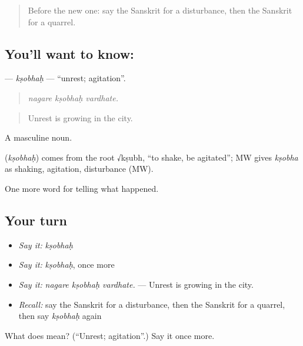 \begin{quote}
Before the new one: say the Sanskrit for a disturbance, then the Sanskrit for a quarrel.
\end{quote}

\subsection*{You'll want to know: }
\textbf{} — \emph{kṣobhaḥ} — \textquotedblleft{}unrest; agitation\textquotedblright{}.

\begin{quote}
  
\end{quote}

\begin{quote}
\emph{nagare kṣobhaḥ vardhate.}
\end{quote}

\begin{quote}
Unrest is growing in the city.
\end{quote}

A masculine noun.

\begin{cousinweb}
\textbf{} (\emph{kṣobhaḥ}) comes from the root √kṣubh, \textquotedblleft{}to shake, be agitated\textquotedblright{}; MW gives \emph{kṣobha} as shaking, agitation, disturbance (MW).
\end{cousinweb}

\begin{grammarlens}[title={What you've built}]
One more word for telling what happened.
\end{grammarlens}

\subsection*{Your turn}
\begin{itemize}
\raggedright
  \item \emph{Say it:} \emph{kṣobhaḥ}
  \item \emph{Say it:} \emph{kṣobhaḥ}, once more
  \item \emph{Say it:} \emph{nagare kṣobhaḥ vardhate.} — Unrest is growing in the city.
  \item \emph{Recall:} say the Sanskrit for a disturbance, then the Sanskrit for a quarrel, then say \emph{kṣobhaḥ} again
\end{itemize}

\begin{tcolorbox}[breakable,colback=teal!4,colframe=teal!35!black,title={Before you move on}]
What does  mean? (\textquotedblleft{}Unrest; agitation\textquotedblright{}.) Say it once more.
\end{tcolorbox}
